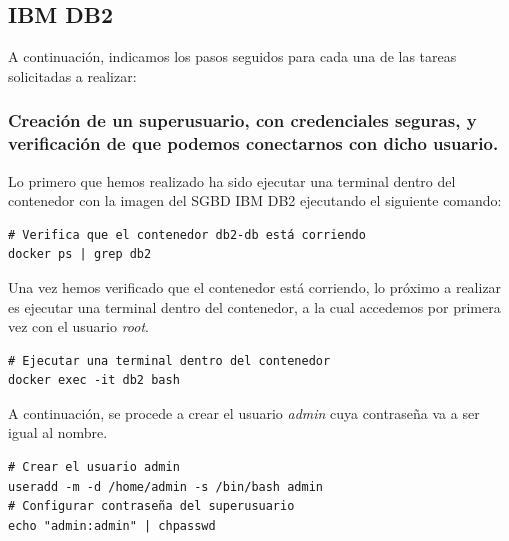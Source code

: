 \documentclass{article}
\begin{document}
\newpage
\subsection{IBM DB2}
A continuación, indicamos los pasos seguidos para cada una de las tareas solicitadas a realizar:
\subsubsection{Creación de un superusuario, con credenciales seguras, y verificación de que podemos conectarnos con dicho usuario.}
Lo primero que hemos realizado ha sido ejecutar una terminal dentro del contenedor con la imagen del SGBD IBM DB2 ejecutando el siguiente comando:
\begin{lstlisting}[style=bashStyle]
# Verifica que el contenedor db2-db está corriendo
docker ps | grep db2
\end{lstlisting}

Una vez hemos verificado que el contenedor está corriendo, lo próximo a realizar es ejecutar una terminal dentro del contenedor, a la cual accedemos por primera vez con el usuario \textit{root}.
\begin{lstlisting}[style=bashStyle]
# Ejecutar una terminal dentro del contenedor
docker exec -it db2 bash
\end{lstlisting}

A continuación, se procede a crear el usuario \textit{admin} cuya contraseña va a ser igual al nombre.
\begin{lstlisting}[style=bashStyle]
# Crear el usuario admin
useradd -m -d /home/admin -s /bin/bash admin
# Configurar contraseña del superusuario
echo "admin:admin" | chpasswd
\end{lstlisting}
\end{document}
